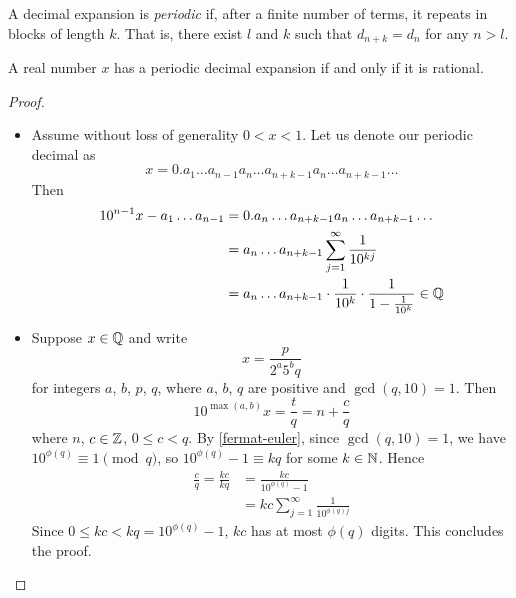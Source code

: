 \documentclass{../../template/note}
\begin{document}

    \begin{definition}
        A decimal expansion is \emph{periodic} if, after a finite number of terms, it repeats in blocks of length \(k\). That is, there exist \(l\) and \(k\) such that \(d_{n+k} = d_n\) for any \(n > l\).
    \end{definition}
    
    \begin{proposition}
        A real number \(x\) has a periodic decimal expansion if and only if it is rational.
    \end{proposition}
    
    \begin{proof}
        \begin{itemize}
            \item[\(\implies\)]
            Assume without loss of generality \(0 < x < 1\). Let us denote our periodic decimal as
            \[
                x = 0.a_1\dots a_{n-1} a_n \dots a_{n+k-1} a_n \dots a_{n+k-1} \dots 
            \]
            Then
            \begin{align*}
                10^{n-1}x - a_1\dots a_{n-1} &= 0.a_n \dots a_{n+k-1} a_n \dots a_{n+k-1} \dots  \\
                &= a_n \dots a_{n+k-1} \sum_{j=1}^\infty \frac{1}{10^{kj}} \\
                &= a_n \dots a_{n+k-1} \cdot \frac{1}{10^k} \cdot \frac{1}{1-\frac{1}{10^k}} \in \mathbb Q
            \end{align*}
            \item[\(\impliedby\)] Suppose \(x \in \mathbb Q\) and write
            \[
                x = \frac{p}{2^a5^bq}
            \]
            for integers \(a\), \(b\), \(p\), \(q\), where \(a\), \(b\), \(q\) are positive and \(\gcd(q, 10) = 1\). Then
            \[
                10^{\max(a,b)}x = \frac{t}{q} = n + \frac{c}{q}
            \]
            where \(n\), \(c \in \mathbb Z\), \(0 \leq c < q\). By \cref{fermat-euler}, since \(\gcd(q, 10) = 1\), we have \(10^{\phi(q)} \equiv 1 \pmod q\), so \(10^{\phi(q)} - 1 \equiv kq\) for some \(k \in \mathbb N\). Hence
            \begin{align*}
                \frac{c}{q} = \frac{kc}{kq} &= \frac{kc}{10^{\phi(q)}-1} \\
                &= kc \sum_{j=1}^\infty \frac{1}{10^{\phi(q)j}}
            \end{align*}
            Since \(0 \leq kc < kq = 10^{\phi(q)} - 1\), \(kc\) has at most \(\phi(q)\) digits. This concludes the proof.
        \end{itemize}
    \end{proof}
    
\end{document}
